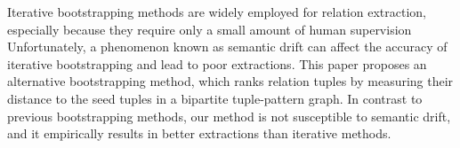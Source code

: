 Iterative bootstrapping methods are widely employed for relation extraction, especially because they require only a small amount of human supervision
 Unfortunately, a phenomenon known as semantic drift can affect the accuracy of 
 iterative bootstrapping and lead to poor extractions. This paper proposes an
 alternative bootstrapping method, which ranks relation tuples by measuring
 their distance to the seed tuples in a bipartite tuple-pattern graph. In
 contrast to previous bootstrapping methods, our method is not susceptible to
 semantic drift, and it empirically results in better extractions than iterative
 methods.

